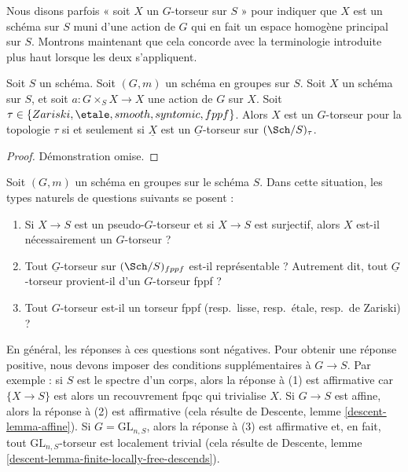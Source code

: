 \noindent
Nous disons parfois « soit $X$ un $G$-torseur sur $S$ » pour indiquer que
$X$ est un schéma sur $S$ muni d'une action de $G$ qui en fait
un espace homogène principal sur $S$.
Montrons maintenant que cela concorde avec la terminologie introduite plus haut
lorsque les deux s'appliquent.

\begin{lemma}
\label{lemma-torsor}
Soit $S$ un schéma.
Soit $(G, m)$ un schéma en groupes sur $S$.
Soit $X$ un schéma sur $S$, et soit
$a : G \times_S X \to X$ une action de $G$ sur $X$.
Soit $\tau \in\allowbreak \{Zariski,\allowbreak \etale,\allowbreak smooth,\allowbreak syntomic,\allowbreak fppf\}$.
Alors $X$ est un $G$-torseur pour la topologie $\tau$ si et seulement si
$\underline{X}$ est un $\underline{G}$-torseur sur $(\Sch/S)_\tau$.
\end{lemma}

\begin{proof}
Démonstration omise.
\end{proof}

\begin{remark}
\label{remark-fun-with-torsors}
Soit $(G, m)$ un schéma en groupes sur le schéma $S$.
Dans cette situation, les types naturels de questions suivants se posent :
\begin{enumerate}
\item Si $X \to S$ est un pseudo-$G$-torseur et si $X \to S$ est surjectif,
alors $X$ est-il nécessairement un $G$-torseur ?
\item Tout $\underline{G}$-torseur sur $(\Sch/S)_{fppf}$ est-il
représentable ? Autrement dit, tout $\underline{G}$-torseur
provient-il d'un $G$-torseur fppf ?
\item Tout $G$-torseur est-il un
torseur fppf (resp.\ lisse, resp.\ \'etale, resp.\ de Zariski) ?
\end{enumerate}
En général, les réponses à ces questions sont négatives. Pour obtenir une réponse positive,
nous devons imposer des conditions supplémentaires à $G \to S$.
Par exemple :
si $S$ est le spectre d'un corps, alors la réponse à (1) est affirmative
car $\{X \to S\}$ est alors un recouvrement fpqc qui trivialise $X$.
Si $G \to S$ est affine, alors la réponse à (2) est affirmative
(cela résulte de Descente, lemme \ref{descent-lemma-affine}).
Si $G = \text{GL}_{n, S}$, alors la réponse à (3) est affirmative
et, en fait, tout $\text{GL}_{n, S}$-torseur est localement trivial
(cela résulte de
Descente, lemme \ref{descent-lemma-finite-locally-free-descends}).
\end{remark}




